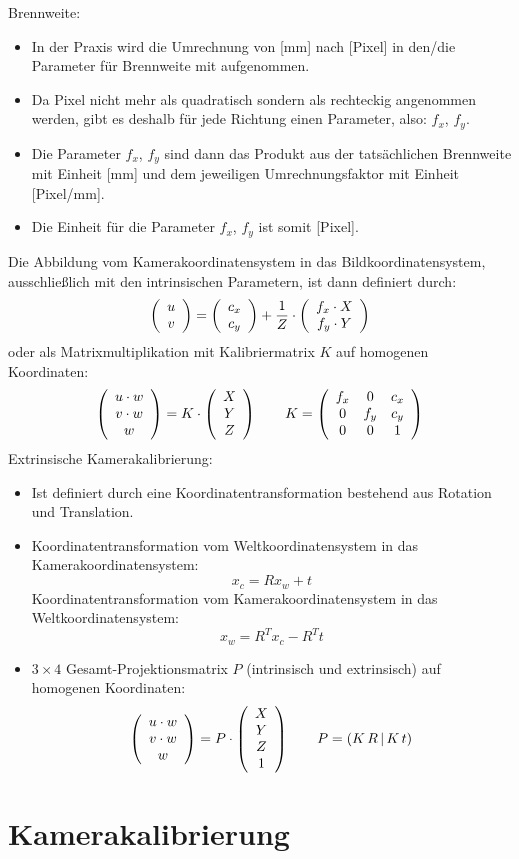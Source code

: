 Brennweite:
\begin{itemize}
\item In der Praxis wird die Umrechnung von [mm] nach [Pixel] in den/die Parameter für Brennweite mit aufgenommen.
\item Da Pixel nicht mehr als quadratisch sondern als rechteckig angenommen werden, gibt es deshalb für jede Richtung einen Parameter, also: $f_x$, $f_y$.
\item Die Parameter $f_x$, $f_y$ sind dann das Produkt aus der tatsächlichen Brennweite mit Einheit [mm] und dem jeweiligen Umrechnungsfaktor mit Einheit [Pixel/mm].
\item Die Einheit für die Parameter $f_x$, $f_y$ ist somit [Pixel].
\end{itemize}
Die Abbildung vom Kamerakoordinatensystem in das Bildkoordinatensystem, ausschließlich mit den intrinsischen Parametern, ist dann definiert durch: $$\left( \begin{array}{c} u \\ v \end{array} \right) = \left( \begin{array}{c} c_x \\ c_y \end{array} \right) + \frac{1}{Z} \cdot \left( \begin{array}{c} f_x \cdot X \\ f_y \cdot Y \end{array} \right)$$ oder als Matrixmultiplikation mit Kalibriermatrix $K$ auf homogenen Koordinaten: $$\left( \begin{array}{c} u \cdot w \\ v \cdot w \\ w \end{array} \right) = K \cdot \left( \begin{array}{c} X \\ Y \\ Z \end{array} \right) \qquad K = \left( \begin{array}{ccc} f_x & 0 & c_x \\ 0 & f_y & c_y \\ 0 & 0 & 1 \end{array} \right)$$
Extrinsische Kamerakalibrierung:
\begin{itemize}
\item Ist definiert durch eine Koordinatentransformation bestehend aus Rotation und Translation.
\item Koordinatentransformation vom Weltkoordinatensystem in das Kamerakoordinatensystem: $$x_c = Rx_w + t$$
Koordinatentransformation vom Kamerakoordinatensystem in das Weltkoordinatensystem: $$x_w = R^T x_c - R^T t$$
\item $3 \times 4$ Gesamt-Projektionsmatrix $P$ (intrinsisch und extrinsisch) auf homogenen Koordinaten: $$\left( \begin{array}{c} u \cdot w \\ v \cdot w \\ w \end{array} \right) = P \cdot \left( \begin{array}{c} X \\ Y \\ Z \\ 1 \end{array} \right) \qquad P = (K \, R \, | \, K \, t)$$
\end{itemize}

\section{Kamerakalibrierung}

